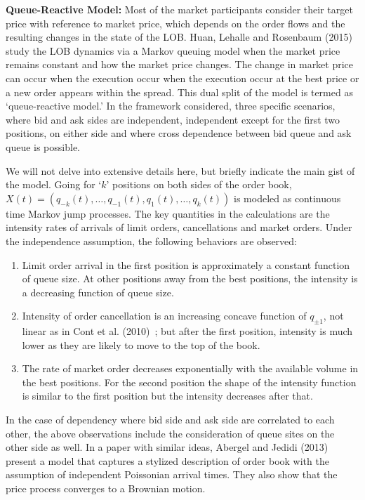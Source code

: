 \noindent\textbf{Queue-Reactive Model:} Most of the market participants consider their target price with reference to market price, which depends on the order flows and the resulting changes in the state of the LOB. Huan, Lehalle and Rosenbaum (2015)~\cite{hlehros} study the LOB dynamics via a Markov queuing model when the market price remains constant and how the market price changes. The change in market price can occur when the execution occur when the execution occur at the best price or a new order appears within the spread. This dual split of the model is termed as `queue-reactive model.' In the framework considered, three specific scenarios, where bid and ask sides are independent, independent except for the first two positions, on either side and where cross dependence between bid queue and ask queue is possible.


We will not delve into extensive details here, but briefly indicate the main gist of the model. Going for `$k$' positions on both sides of the order book, $X(t)= (q_{-k}(t),\ldots,q_{-1}(t),q_1(t),\ldots,q_k(t))$ is modeled as continuous time Markov jump processes. The key quantities in the calculations are the intensity rates of arrivals of limit orders, cancellations and market orders. Under the independence assumption, the following behaviors are observed:

\begin{enumerate}[--]
\item Limit order arrival in the first position is approximately a constant function of queue size. At other positions away from the best positions, the intensity is a decreasing function of queue size. 

\item Intensity of order cancellation is an increasing concave function of $q_{\pm1}$, not linear as in Cont et al. (2010)~\cite{contstoi}; but after the first position, intensity is much lower as they are likely to move to the top of the book.

\item The rate of market order decreases exponentially with the available volume in the best positions. For the second position the shape of the intensity function is similar to the first position but the intensity decreases after that.
\end{enumerate}


In the case of dependency where bid side and ask side are correlated to each other, the above observations include the consideration of queue sites on the other side as well. In a paper with similar ideas, Abergel and Jedidi (2013)~\cite{aberjed} present a model that captures a stylized description of order book with the assumption of independent Poissonian arrival times. They also show that the price process converges to a Brownian motion. 


